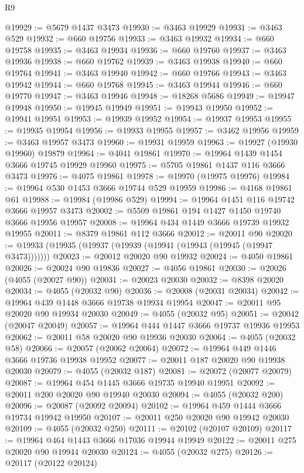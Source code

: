 \begin{lexlean}{R9}
\begin{coremodule}
@19929 := @5679 @1437 @3473
@19930 := @3463 @19929
@19931 := @3463 @529
@19932 := @660 @19756
@19933 := @3463 @19932
@19934 := @660 @19758
@19935 := @3463 @19934
@19936 := @660 @19760
@19937 := @3463 @19936
@19938 := @660 @19762
@19939 := @3463 @19938
@19940 := @660 @19764
@19941 := @3463 @19940
@19942 := @660 @19766
@19943 := @3463 @19942
@19944 := @660 @19768
@19945 := @3463 @19944
@19946 := @660 @19770
@19947 := @3463 @19946
@19948 := @18268 @5686
@19949 := @19947 @19948
@19950 := @19945 @19949
@19951 := @19943 @19950
@19952 := @19941 @19951
@19953 := @19939 @19952
@19954 := @19937 @19953
@19955 := @19935 @19954
@19956 := @19933 @19955
@19957 := @3462 @19956
@19959 := @3463 @19957 @3473
@19960 := @19931 @19959
@19963 := @19927 (@19930 @19960) @19879
@19964 := @4041 @19861
@19970 := @19964 @1439 @1454 @3666 @19745 @19929 @19960
@19975 := @5705 @19861 @1437 @116 @3666 @3473
@19976 := @4075 @19861
@19978 := @19970 (@19975 @19976)
@19984 := @19964 @530 @1453 @3666 @19744 @529 @19959
@19986 := @4168 @19861 @61
@19988 := @19984 (@19986 @529)
@19994 := @19964 @1451 @116 @19742 @3666 @19957 @3473
@20002 := @5509 @19861 @194 @1427 @1450 @19740 @3666 @19956 @19957
@20008 := @19964 @434 @1449 @3666 @19739 @19932 @19955
@20011 := @8379 @19861 @112 @3666
@20012 := @20011 @90
@20020 := @19933 (@19935 (@19937 (@19939 (@19941 (@19943 (@19945 (@19947 @3473)))))))
@20023 := @20012 @20020 @90 @19932
@20024 := @4050 @19861
@20026 := @20024 @90 @19836
@20027 := @4056 @19861
@20030 := @20026 (@4055 (@20027 @90))
@20031 := @20023 @20030
@20032 := @8398 @20020
@20034 := @4055 (@20032 @90)
@20036 := @20008 (@20031 @20034)
@20042 := @19964 @439 @1448 @3666 @19738 @19934 @19954
@20047 := @20011 @95 @20020 @90 @19934 @20030
@20049 := @4055 (@20032 @95)
@20051 := @20042 (@20047 @20049)
@20057 := @19964 @444 @1447 @3666 @19737 @19936 @19953
@20062 := @20011 @58 @20020 @90 @19936 @20030
@20064 := @4055 (@20032 @58)
@20066 := @20057 (@20062 @20064)
@20072 := @19964 @449 @1446 @3666 @19736 @19938 @19952
@20077 := @20011 @187 @20020 @90 @19938 @20030
@20079 := @4055 (@20032 @187)
@20081 := @20072 (@20077 @20079)
@20087 := @19964 @454 @1445 @3666 @19735 @19940 @19951
@20092 := @20011 @200 @20020 @90 @19940 @20030
@20094 := @4055 (@20032 @200)
@20096 := @20087 (@20092 @20094)
@20102 := @19964 @459 @1444 @3666 @19734 @19942 @19950
@20107 := @20011 @250 @20020 @90 @19942 @20030
@20109 := @4055 (@20032 @250)
@20111 := @20102 (@20107 @20109)
@20117 := @19964 @464 @1443 @3666 @17036 @19944 @19949
@20122 := @20011 @275 @20020 @90 @19944 @20030
@20124 := @4055 (@20032 @275)
@20126 := @20117 (@20122 @20124)

\end{coremodule}
\end{lexlean}
